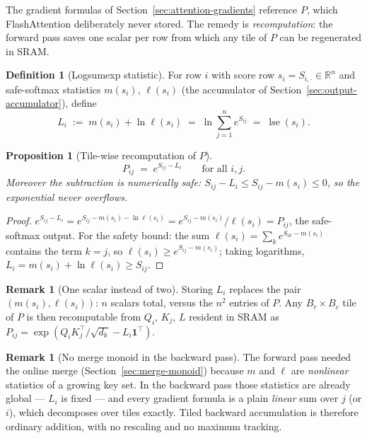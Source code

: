 \documentclass[11pt]{amsart}
\theoremstyle{plain}
\newtheorem{proposition}[theorem]{Proposition}
\theoremstyle{definition}
\newtheorem{definition}[theorem]{Definition}
\newtheorem{remark}[theorem]{Remark}
\newcommand{\R}{\mathbb{R}}
\newcommand{\logsumexp}{\operatorname{lse}}
\begin{document}
The gradient formulas of Section~\ref{sec:attention-gradients} reference $P$,
which FlashAttention deliberately never stored.  The remedy
\cite{Dao2022} is \emph{recomputation}: the forward pass saves one scalar per
row from which any tile of $P$ can be regenerated in SRAM.

\begin{definition}[Logsumexp statistic]
\label{def:logsumexp-stat}
For row $i$ with score row $s_i = S_{i,\cdot} \in \R^n$ and safe-softmax
statistics $m(s_i)$, $\ell(s_i)$ (the accumulator of
Section~\ref{sec:output-accumulator}), define
\[
    L_i \;:=\; m(s_i) + \ln \ell(s_i)
    \;=\; \ln \sum_{j=1}^n e^{S_{ij}}
    \;=\; \logsumexp(s_i).
\]
\end{definition}

\begin{proposition}[Tile-wise recomputation of $P$]
\label{prop:recompute-p}
\[
    P_{ij} \;=\; e^{S_{ij} - L_i} \qquad \text{for all } i, j.
\]
Moreover the subtraction is numerically safe: $S_{ij} - L_i \leq
S_{ij} - m(s_i) \leq 0$, so the exponential never overflows.
\end{proposition}
\begin{proof}
$e^{S_{ij} - L_i} = e^{S_{ij} - m(s_i) - \ln \ell(s_i)}
= e^{S_{ij} - m(s_i)}/\ell(s_i) = P_{ij}$, the safe-softmax output.  For
the safety bound: the sum $\ell(s_i) = \sum_k e^{S_{ik} - m(s_i)}$
contains the term $k = j$, so $\ell(s_i) \geq e^{S_{ij} - m(s_i)}$; taking
logarithms, $L_i = m(s_i) + \ln \ell(s_i) \geq S_{ij}$.
\end{proof}

\begin{remark}[One scalar instead of two]
Storing $L_i$ replaces the pair $(m(s_i), \ell(s_i))$: $n$ scalars total,
versus the $n^2$ entries of $P$.  Any $B_r \times B_c$ tile of $P$ is then
recomputable from $Q_i$, $K_j$, $L$ resident in SRAM as
$P_{ij} = \exp(Q_i K_j^\top/\sqrt{d_k} - L_i \mathbf{1}^\top)$.
\end{remark}

\begin{remark}[No merge monoid in the backward pass]
The forward pass needed the online merge (Section~\ref{sec:merge-monoid})
because $m$ and $\ell$ are \emph{nonlinear} statistics of a growing key set.
In the backward pass those statistics are already global — $L_i$ is fixed —
and every gradient formula is a plain \emph{linear} sum over $j$ (or $i$),
which decomposes over tiles exactly.  Tiled backward accumulation is
therefore ordinary addition, with no rescaling and no maximum tracking.
\end{remark}
\end{document}

